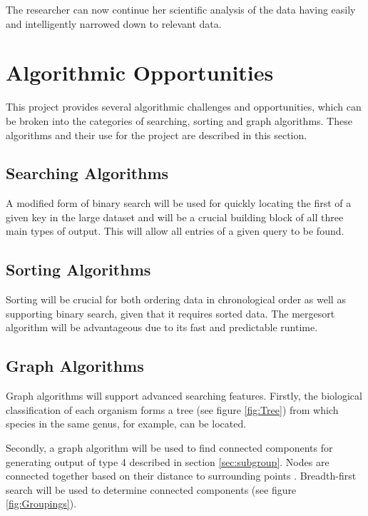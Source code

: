 \documentclass{article}
\begin{document}
The researcher can now continue her scientific analysis of the data having easily and intelligently narrowed down to relevant data.

\section{Algorithmic Opportunities}
This project provides several algorithmic challenges and opportunities, which can be broken into the categories of searching, sorting and graph algorithms. These algorithms and their use for the project are described in this section.

\subsection{Searching Algorithms}
A modified form of binary search will be used for quickly locating the first of a given key in the large dataset and will be a crucial building block of all three main types of output. This will allow all entries of a given query to be found.

\subsection{Sorting Algorithms}
Sorting will be crucial for both ordering data in chronological order as well as supporting binary search, given that it requires sorted data. The mergesort algorithm will be advantageous due to its fast and predictable runtime.

\subsection{Graph Algorithms}\label{sec:graphalgs}
Graph algorithms will support advanced searching features. Firstly, the biological classification of each organism forms a tree (see figure \ref{fig:Tree}) from which species in the same genus, for example, can be located. 

Secondly, a graph algorithm will be used to find connected components for generating output of type 4 described in section \ref{sec:subgroup}. Nodes are connected together based on their distance to surrounding points \citep{tom10}. Breadth-first search will be used to determine connected components \citep{broder2000graph} (see figure \ref{fig:Groupings}).
\end{document}
